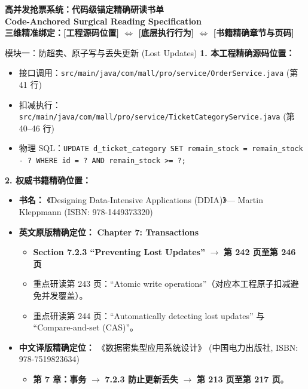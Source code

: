 \documentclass[a4paper,10pt]{ctexart}
\begin{document}
\begin{center}
    {\LARGE \textbf{高并发抢票系统：代码级锚定精确研读书单}} \\[4pt]
    {\large \textbf{Code-Anchored Surgical Reading Specification}} \\[3pt]
    \textbf{三维精准绑定：[工程源码位置] $\Longleftrightarrow$ [底层执行行为] $\Longleftrightarrow$ [书籍精确章节与页码]}
\end{center}

\vspace{0.2cm}

\begin{curriculumbox}{模块一：防超卖、原子写与丢失更新 (Lost Updates)}
\textbf{1. 本工程精确源码位置：}
\begin{itemize}[leftmargin=1.2cm, noitemsep]
    \item 接口调用：\texttt{src/main/java/com/mall/pro/service/OrderService.java} (第 41 行)
    \item 扣减执行：\texttt{src/main/java/com/mall/pro/service/TicketCategoryService.java} (第 40--46 行)
    \item 物理 SQL：\texttt{UPDATE d\_ticket\_category SET remain\_stock = remain\_stock - ? WHERE id = ? AND remain\_stock >= ?;}
\end{itemize}

\textbf{2. 权威书籍精确位置：}
\begin{itemize}[leftmargin=1.2cm, noitemsep]
    \item \textbf{书名：} 《Designing Data-Intensive Applications (DDIA)》--- Martin Kleppmann (ISBN: 978-1449373320)
    \item \textbf{英文原版精确定位：} \textbf{Chapter 7: Transactions}
    \begin{itemize}
        \item \textbf{Section 7.2.3 ``Preventing Lost Updates''} $\rightarrow$ \textbf{第 242 页至第 246 页}
        \item 重点研读第 243 页：``Atomic write operations''（对应本工程原子扣减避免并发覆盖）。
        \item 重点研读第 244 页：``Automatically detecting lost updates'' 与 ``Compare-and-set (CAS)''。
    \end{itemize}
    \item \textbf{中文译版精确定位：} 《数据密集型应用系统设计》 (中国电力出版社, ISBN: 978-7519823634)
    \begin{itemize}
        \item \textbf{第 7 章：事务} $\rightarrow$ \textbf{7.2.3 防止更新丢失} $\rightarrow$ \textbf{第 213 页至第 217 页}。
    \end{itemize}
\end{itemize}
\end{curriculumbox}
\end{document}
